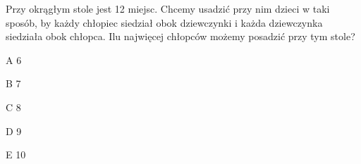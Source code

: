 \begin{tresc}
Przy okrągłym stole jest 12 miejsc. Chcemy usadzić przy nim dzieci w taki sposób, by każdy chłopiec siedział obok dziewczynki i każda dziewczynka siedziała obok chłopca. Ilu najwięcej chłopców możemy posadzić przy tym stole?
\end{tresc}
\begin{wariant}{A} 6 \end{wariant}
\begin{wariant}{B} 7 \end{wariant}
\begin{wariant}{C} 8 \end{wariant}
\begin{wariant}{D} 9 \end{wariant}
\begin{wariant}{E} 10 \end{wariant}
